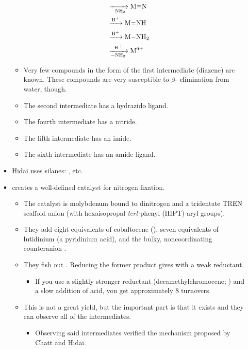 \documentclass[../notes.tex]{subfiles}
\begin{document}
\begin{itemize}
\begin{align*}
        &\ce{->[][-NH3]} \ce{M#N}\\
        &\ce{->[H+]} \ce{M=NH}\\
        &\ce{->[H+]} \ce{M-NH2}\\
        &\ce{->[H+][-NH3]} \ce{M^{6+}}
    \end{align*}
    \begin{itemize}
        \item Very few compounds in the form of the first intermediate (diazene) are known. These compounds are very susceptible to $\beta$- elimination from water, though.
        \item The second intermediate has a hydrazido ligand.
        \item The fourth intermediate has a nitride.
        \item The fifth intermediate has an imide.
        \item The sixth intermediate has an amide ligand.
    \end{itemize}
    \item Hidai uses silanes: , etc.
    \item \textcite{bib:SchrockYandulov} creates a well-defined catalyst for nitrogen fixation.
    \begin{itemize}
        \item The catalyst is molybdenum bound to dinitrogen and a tridentate TREN scaffold anion (with hexaisopropal \emph{tert}-phenyl (HIPT) aryl groups).
        \item They add eight equivalents of cobaltocene (), seven equivalents of lutidinium (a pyridinium acid), and the bulky, noncoordinating counteranion \ce{[BAr^F{}_4]-}.
        \item They fish out . Reducing the former product gives  with a weak reductant.
        \begin{itemize}
            \item If you use a slightly stronger reductant (decamethylchromocene; ) and a slow addition of acid, you get approximately 8 turnovers.
        \end{itemize}
        \item This is not a great yield, but the important part is that it exists and they can observe all of the intermediates.
        \begin{itemize}
            \item Observing said intermediates verified the mechanism proposed by Chatt and Hidai.

\end{itemize}
\end{itemize}
\end{itemize}
\end{document}
